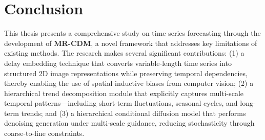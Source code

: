 \section{Conclusion}
\label{sec:conclusion}

This thesis presents a comprehensive study on time series forecasting through the development of \textbf{MR-CDM}, a novel framework that addresses key limitations of existing methods. The research makes several significant contributions: (1) a delay embedding technique that converts variable-length time series into structured 2D image representations while preserving temporal dependencies, thereby enabling the use of spatial inductive biases from computer vision; (2) a hierarchical trend decomposition module that explicitly captures multi-scale temporal patterns—including short-term fluctuations, seasonal cycles, and long-term trends; and (3) a hierarchical conditional diffusion model that performs denoising generation under multi-scale guidance, reducing stochasticity through coarse-to-fine constraints.


    